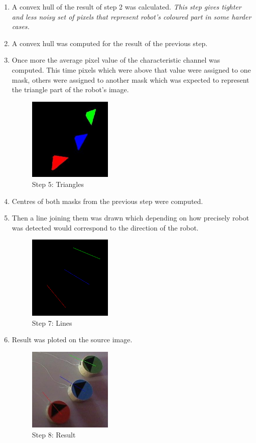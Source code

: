 \documentclass[10pt,a4paper,twocolumn]{article}
\begin{document}
\begin{enumerate}
    \item
    A convex hull of the result of step 2 was calculated.
    \textit{
    This step gives tighter and less noisy set of pixels that represent robot's
    coloured part in some harder cases.
    }

    \item
    A convex hull was computed for the result of the previous step. 

    \item
    Once more the average pixel value of the characteristic channel was 
    computed. This time pixels which were above that value were assigned to 
    one mask, others were assigned to another mask which was expected to 
    represent the triangle part of the robot's image.
    \begin{figure}[h]
        \centering
        \includegraphics[width=40mm]{d1_i5_triangles.jpg}
        \caption{Step 5: Triangles}
    \end{figure} 

    \item
    Centres of both masks from the previous step were computed. 

    \item
    Then a line joining them was drawn which depending on how precisely robot
    was detected would correspond to the direction of the robot.
    \begin{figure}[h]
        \centering
        \includegraphics[width=40mm]{d1_i5_lines.png}
        \caption{Step 7: Lines}
    \end{figure} 

    \item
    Result was ploted on the source image.
    \begin{figure}[h]
        \centering
        \includegraphics[width=40mm]{d1_i5_result.jpg}
        \caption{Step 8: Result}
    \end{figure} 
\end{enumerate} 
\end{document}
